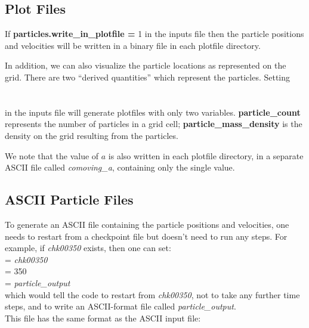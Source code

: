 \subsection{Plot Files}

If {\bf particles.write\_in\_plotfile =} 1 in the inputs file 
then the particle positions and velocities will be written in a binary file in each plotfile directory.  

In addition, we can also
visualize the particle locations as represented on the grid.  There are two ``derived quantities''
which represent the particles.  Setting \\

 \\
 \\

\noindent in the inputs file will generate plotfiles with only two variables.  
{\bf particle\_count} represents the number of particles in a grid cell; 
{\bf particle\_mass\_density} is the density on the grid resulting from the particles.

We note that the value of $a$ is also written in each plotfile directory, 
in a separate ASCII file called {\em comoving\_a}, containing only the single value. \\

\subsection{ASCII Particle Files}

To generate an ASCII file containing the particle positions and velocities, 
one needs to restart from a checkpoint
file but doesn't need to run any steps.  For example, if {\em chk00350} exists, then one can set: \\

 = {\em chk00350} \\
 = 350 \\
 = {\em particle\_output} \\

\noindent which would tell the code to restart from {\em chk00350}, not to take any further time steps, and to write an ASCII-format 
file called {\em particle\_output}. \\

\noindent This file has the same format as the ASCII input file: \\

